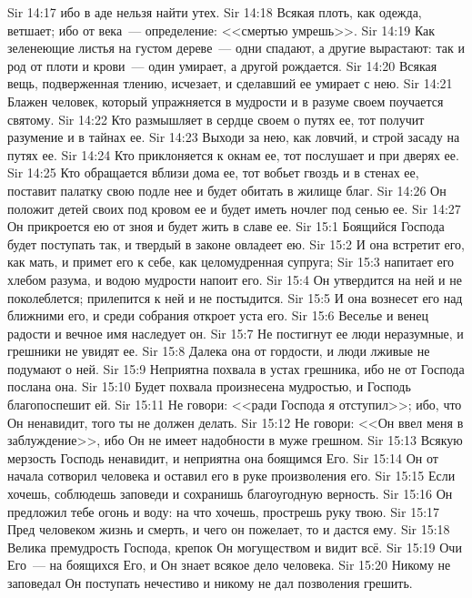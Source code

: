 \vs Sir 14:17 ибо в аде нельзя найти утех.
\vs Sir 14:18 Всякая плоть, как одежда, ветшает; ибо от века~--- определение: <<смертью умрешь>>.
\vs Sir 14:19 Как зеленеющие листья на густом дереве~--- одни спадают, а другие вырастают: так и род от плоти и крови~--- один умирает, а другой рождается.
\vs Sir 14:20 Всякая вещь, подверженная тлению, исчезает, и сделавший ее умирает с нею.
\rsbpar\vs Sir 14:21 Блажен человек, который упражняется в мудрости и в разуме своем поучается святому.
\vs Sir 14:22 Кто размышляет в сердце своем о путях ее, тот получит разумение и в тайнах ее.
\vs Sir 14:23 Выходи за нею, как ловчий, и строй засаду на путях ее.
\vs Sir 14:24 Кто приклоняется к окнам ее, тот послушает и при дверях ее.
\vs Sir 14:25 Кто обращается вблизи дома ее, тот вобьет гвоздь и в стенах ее, поставит палатку свою подле нее и будет обитать в жилище благ.
\vs Sir 14:26 Он положит детей своих под кровом ее и будет иметь ночлег под сенью ее.
\vs Sir 14:27 Он прикроется ею от зноя и будет жить в славе ее.
\vs Sir 15:1 Боящийся Господа будет поступать так, и твердый в законе овладеет ею.
\vs Sir 15:2 И она встретит его, как мать, и примет его к себе, как целомудренная супруга;
\vs Sir 15:3 напитает его хлебом разума, и водою мудрости напоит его.
\vs Sir 15:4 Он утвердится на ней и не поколеблется; прилепится к ней и не постыдится.
\vs Sir 15:5 И она вознесет его над ближними его, и среди собрания откроет уста его.
\vs Sir 15:6 Веселье и венец радости и вечное имя наследует он.
\vs Sir 15:7 Не постигнут ее люди неразумные, и грешники не увидят ее.
\vs Sir 15:8 Далека она от гордости, и люди лживые не подумают о ней.
\vs Sir 15:9 Неприятна похвала в устах грешника, ибо не от Господа послана она.
\vs Sir 15:10 Будет похвала произнесена мудростью, и Господь благопоспешит ей.
\rsbpar\vs Sir 15:11 Не говори: <<ради Господа я отступил>>; ибо, что Он ненавидит, того ты не должен делать.
\vs Sir 15:12 Не говори: <<Он ввел меня в заблуждение>>, ибо Он не имеет надобности в муже грешном.
\vs Sir 15:13 Всякую мерзость Господь ненавидит, и неприятна она боящимся Его.
\vs Sir 15:14 Он от начала сотворил человека и оставил его в руке произволения его.
\vs Sir 15:15 Если хочешь, соблюдешь заповеди и сохранишь благоугодную верность.
\vs Sir 15:16 Он предложил тебе огонь и воду: на что хочешь, прострешь руку твою.
\vs Sir 15:17 Пред человеком жизнь и смерть, и чего он пожелает, то и дастся ему.
\vs Sir 15:18 Велика премудрость Господа, крепок Он могуществом и видит всё.
\vs Sir 15:19 Очи Его~--- на боящихся Его, и Он знает всякое дело человека.
\vs Sir 15:20 Никому не заповедал Он поступать нечестиво и никому не дал позволения грешить.
